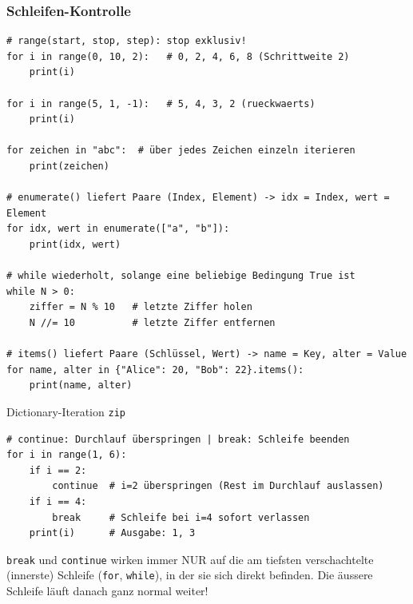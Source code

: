 \subsubsection{Schleifen-Kontrolle}\label{sec:01-kontrollstrukturen}
\begin{codebox}
\begin{lstlisting}[style=CodeExpert]
# range(start, stop, step): stop exklusiv!
for i in range(0, 10, 2):   # 0, 2, 4, 6, 8 (Schrittweite 2)
    print(i)

for i in range(5, 1, -1):   # 5, 4, 3, 2 (rueckwaerts)
    print(i)

for zeichen in "abc":  # über jedes Zeichen einzeln iterieren
    print(zeichen)

# enumerate() liefert Paare (Index, Element) -> idx = Index, wert = Element
for idx, wert in enumerate(["a", "b"]):
    print(idx, wert)

# while wiederholt, solange eine beliebige Bedingung True ist
while N > 0:
    ziffer = N % 10   # letzte Ziffer holen
    N //= 10          # letzte Ziffer entfernen

# items() liefert Paare (Schlüssel, Wert) -> name = Key, alter = Value
for name, alter in {"Alice": 20, "Bob": 22}.items():
    print(name, alter)
\end{lstlisting}
Dictionary-Iteration \enspace
\texttt{zip} 
\end{codebox}

\begin{codebox}
\begin{lstlisting}[style=CodeExpert]
# continue: Durchlauf überspringen | break: Schleife beenden
for i in range(1, 6):
    if i == 2:
        continue  # i=2 überspringen (Rest im Durchlauf auslassen)
    if i == 4:
        break     # Schleife bei i=4 sofort verlassen
    print(i)      # Ausgabe: 1, 3
\end{lstlisting}
\texttt{break} und \texttt{continue} wirken immer NUR auf die am tiefsten verschachtelte (innerste) Schleife (\texttt{for}, \texttt{while}), in der sie sich direkt befinden. Die äussere Schleife läuft danach ganz normal weiter!
\end{codebox}

